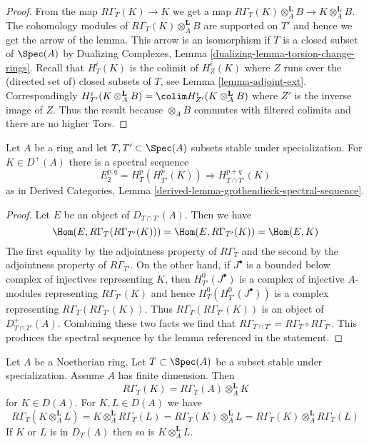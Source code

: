 \begin{proof}
From the map $R\Gamma_T(K) \to K$ we get a map
$R\Gamma_T(K) \otimes_A^\mathbf{L} B \to K \otimes_A^\mathbf{L} B$.
The cohomology modules of $R\Gamma_T(K) \otimes_A^\mathbf{L} B$
are supported on $T'$ and hence we get the arrow of the lemma.
This arrow is an isomorphism if $T$ is a closed subset of $\Spec(A)$ by
Dualizing Complexes, Lemma \ref{dualizing-lemma-torsion-change-rings}.
Recall that $H^i_T(K)$ is the colimit of $H^i_Z(K)$ where $Z$ runs over
the (directed set of) closed subsets of $T$, see
Lemma \ref{lemma-adjoint-ext}.
Correspondingly
$H^i_{T'}(K \otimes_A^\mathbf{L} B) =
\colim H^i_{Z'}(K \otimes_A^\mathbf{L} B)$ where $Z'$ is the inverse
image of $Z$. Thus the result because $\otimes_A B$ commutes
with filtered colimits and there are no higher Tors.
\end{proof}

\begin{lemma}
\label{lemma-local-cohomology-ss}
Let $A$ be a ring and let $T, T' \subset \Spec(A)$ subsets
stable under specialization. For $K \in D^+(A)$
there is a spectral sequence
$$
E_2^{p, q} = H^p_T(H^p_{T'}(K)) \Rightarrow H^{p + q}_{T \cap T'}(K)
$$
as in Derived Categories, Lemma
\ref{derived-lemma-grothendieck-spectral-sequence}.
\end{lemma}

\begin{proof}
Let $E$ be an object of $D_{T \cap T'}(A)$. Then we have
$$
\Hom(E, R\Gamma_T(R\Gamma_{T'}(K))) =
\Hom(E, R\Gamma_{T'}(K)) =
\Hom(E, K)
$$
The first equality by the adjointness property of $R\Gamma_T$
and the second by the adjointness property of $R\Gamma_{T'}$.
On the other hand, if $J^\bullet$ is a bounded below complex
of injectives representing $K$, then $H^0_{T'}(J^\bullet)$
is a complex of injective $A$-modules representing $R\Gamma_{T'}(K)$
and hence $H^0_T(H^0_{T'}(J^\bullet))$ is a complex representing
$R\Gamma_T(R\Gamma_{T'}(K))$. Thus $R\Gamma_T(R\Gamma_{T'}(K))$
is an object of $D^+_{T \cap T'}(A)$. Combining these two
facts we find that $R\Gamma_{T \cap T'} = R\Gamma_T \circ R\Gamma_{T'}$.
This produces the spectral sequence by the lemma referenced
in the statement.
\end{proof}

\begin{lemma}
\label{lemma-torsion-tensor-product}
Let $A$ be a Noetherian ring. Let $T \subset \Spec(A)$ be a subset
stable under specialization. Assume $A$ has finite dimension. Then
$$
R\Gamma_T(K) = R\Gamma_T(A) \otimes_A^\mathbf{L} K
$$
for $K \in D(A)$. For $K, L \in D(A)$ we have
$$
R\Gamma_T(K \otimes_A^\mathbf{L} L) =
K \otimes_A^\mathbf{L} R\Gamma_T(L) =
R\Gamma_T(K) \otimes_A^\mathbf{L} L =
R\Gamma_T(K) \otimes_A^\mathbf{L} R\Gamma_T(L)
$$
If $K$ or $L$ is in $D_T(A)$ then so is $K \otimes_A^\mathbf{L} L$.
\end{lemma}


